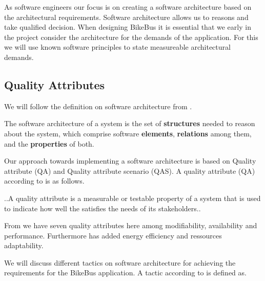 As software engineers our focus is on creating a software architecture based on the architectural requirements. Software architecture allows us to reasons and take qualified decision. When designing BikeBus it is essential that we early in the project consider the architecture for the demands of the application. For this we will use known software principles to state measureable architectural demands. 

\subsection{Quality Attributes}
We will follow the definition on software architecture from \cite{Bass}. 
\begin{defi}
The software architecture of a system is the set of \textbf{structures} needed to reason about the system, which comprise software \textbf{elements}, \textbf{relations} among them, and the \textbf{properties} of both. 
\end{defi}


Our approach towards implementing a software architecture is based on Quality attribute (QA) and Quality attribute scenario (QAS). A quality attribute (QA) according to \cite{Bass} is as follows.

\begin{defi}
..A quality attribute is a measurable or testable property of a system that is used to indicate how well the satisfies the needs of its stakeholders..  
\end{defi}



From \cite{Bass} we have seven quality attributes here among modifiability, availability and performance. Furthermore \cite{Kjaergaard:2015:AQT:2737182.2737196} has added energy efficiency and ressources adaptability.  


We will discuss different tactics on software architecture for achieving the requirements for the BikeBus application. A tactic according to \cite{Bass} is defined as.

